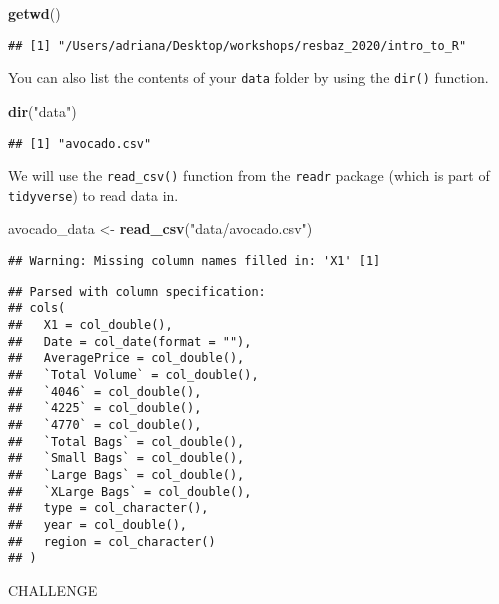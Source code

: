 \documentclass[]{book}
\newenvironment{Shaded}{\begin{snugshade}}{\end{snugshade}}
\newcommand{\KeywordTok}[1]{\textcolor[rgb]{0.13,0.29,0.53}{\textbf{#1}}}
\newcommand{\NormalTok}[1]{#1}
\newcommand{\StringTok}[1]{\textcolor[rgb]{0.31,0.60,0.02}{#1}}
\begin{document}
\begin{Shaded}
\begin{Highlighting}[]
\KeywordTok{getwd}\NormalTok{()}
\end{Highlighting}
\end{Shaded}

\begin{verbatim}
## [1] "/Users/adriana/Desktop/workshops/resbaz_2020/intro_to_R"
\end{verbatim}

You can also list the contents of your \texttt{data} folder by using the \texttt{dir()} function.

\begin{Shaded}
\begin{Highlighting}[]
\KeywordTok{dir}\NormalTok{(}\StringTok{"data"}\NormalTok{)}
\end{Highlighting}
\end{Shaded}

\begin{verbatim}
## [1] "avocado.csv"
\end{verbatim}

We will use the \texttt{read\_csv()} function from the \texttt{readr} package (which is part of \texttt{tidyverse}) to read data in.

\begin{Shaded}
\begin{Highlighting}[]
\NormalTok{avocado_data <-}\StringTok{ }\KeywordTok{read_csv}\NormalTok{(}\StringTok{"data/avocado.csv"}\NormalTok{)}
\end{Highlighting}
\end{Shaded}

\begin{verbatim}
## Warning: Missing column names filled in: 'X1' [1]
\end{verbatim}

\begin{verbatim}
## Parsed with column specification:
## cols(
##   X1 = col_double(),
##   Date = col_date(format = ""),
##   AveragePrice = col_double(),
##   `Total Volume` = col_double(),
##   `4046` = col_double(),
##   `4225` = col_double(),
##   `4770` = col_double(),
##   `Total Bags` = col_double(),
##   `Small Bags` = col_double(),
##   `Large Bags` = col_double(),
##   `XLarge Bags` = col_double(),
##   type = col_character(),
##   year = col_double(),
##   region = col_character()
## )
\end{verbatim}

\leavevmode\hypertarget{challenge}{}%
CHALLENGE
\end{document}
